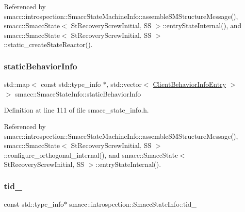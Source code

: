 Referenced by smacc\+::introspection\+::\+Smacc\+State\+Machine\+Info\+::assemble\+S\+M\+Structure\+Message(), smacc\+::\+Smacc\+State$<$ St\+Recovery\+Screw\+Initial, S\+S $>$\+::entry\+State\+Internal(), and smacc\+::\+Smacc\+State$<$ St\+Recovery\+Screw\+Initial, S\+S $>$\+::static\+\_\+create\+State\+Reactor().

\mbox{\label{classsmacc_1_1introspection_1_1SmaccStateInfo_ad3d8b3450060cb0b91f38fb2fe0a7678}} 
\subsubsection{\texorpdfstring{static\+Behavior\+Info}{staticBehaviorInfo}}
{\footnotesize\ttfamily std\+::map$<$ const std\+::type\+\_\+info $\ast$, std\+::vector$<$ \hyperlink{structsmacc_1_1introspection_1_1ClientBehaviorInfoEntry}{Client\+Behavior\+Info\+Entry} $>$ $>$ smacc\+::\+Smacc\+State\+Info\+::static\+Behavior\+Info\hspace{0.3cm}{\ttfamily [static]}}



Definition at line 111 of file smacc\+\_\+state\+\_\+info.\+h.



Referenced by smacc\+::introspection\+::\+Smacc\+State\+Machine\+Info\+::assemble\+S\+M\+Structure\+Message(), smacc\+::\+Smacc\+State$<$ St\+Recovery\+Screw\+Initial, S\+S $>$\+::configure\+\_\+orthogonal\+\_\+internal(), and smacc\+::\+Smacc\+State$<$ St\+Recovery\+Screw\+Initial, S\+S $>$\+::entry\+State\+Internal().

\mbox{\label{classsmacc_1_1introspection_1_1SmaccStateInfo_a37d0d0bce171b57b8d3a39f44ab45248}} 
\subsubsection{\texorpdfstring{tid\+\_\+}{tid\_}}
{\footnotesize\ttfamily const std\+::type\+\_\+info$\ast$ smacc\+::introspection\+::\+Smacc\+State\+Info\+::tid\+\_\+}



